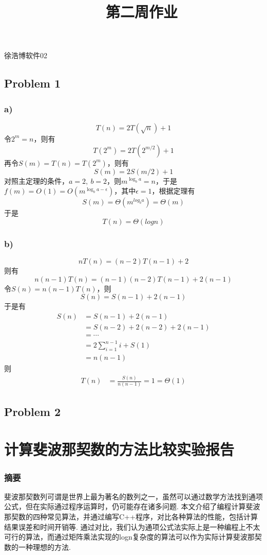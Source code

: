 \documentclass[UTF8]{ctexart}
\begin{document}
\renewcommand{\thefootnote}{\fnsymbol{footnote}}
\linespread{1.4}
\title{\vspace{-5em}\ \ 第二周作业\vspace{-2.5em}}
\date{}
\maketitle
\begin{center}
{\fangsong 徐浩博\quad 软件02}
\end{center}


\subsection*{Problem 1}
\subsubsection*{a)}
$$T(n)=2T(\sqrt{n})+1$$令$2^m=n$，则有$$T(2^m)=2T(2^{m/2})+1$$
再令$S(m)=T(n)=T(2^m)$，则有$$S(m)=2S(m/2)+1$$
对照主定理的条件，$a=2,\ b=2$，则$m^{\log_b a}=n$，于是$f(m)=O(1)=O(m^{\log_b a-\epsilon})$，其中$\epsilon = 1$，根据定理有
$$S(m)=\Theta(m^{log_b a})=\Theta(m)$$
于是
$$T(n)=\Theta(log n)$$
\subsubsection*{b)}
$$nT(n)=(n-2)T(n-1)+2$$
则有$$n(n-1)T(n)=(n-1)(n-2)T(n-1)+2(n-1)$$
令$S(n)=n(n-1)T(n)$，则$$S(n)=S(n-1)+2(n-1)$$
于是有
\begin{align*}
    S(n)&=S(n-1)+2(n-1)\\ &=S(n-2)+2(n-2)+2(n-1)\\ & =\cdots\\
    & = 2\sum\limits^{n-1}_{i=1}i + S(1) \\ & = n(n-1) 
\end{align*}
则
\begin{align*}
    T(n)&=\frac{S(n)}{n(n-1)}=1=\Theta(1)
\end{align*}


\subsection*{Problem 2}
\section*{计算斐波那契数的方法比较实验报告}
\subsubsection*{摘要}
{\kaishu\normalsize  斐波那契数列可谓是世界上最为著名的数列之一，虽然可以通过数学方法找到通项公式，但在实际通过程序运算时，仍可能存在诸多问题. 本文介绍了编程计算斐波那契数的四种常见算法，并通过编写C++程序，对比各种算法的性能，包括计算结果误差和时间开销等. 通过对比，我们认为通项公式法实际上是一种编程上不太可行的算法，而通过矩阵乘法实现的logn复杂度的算法可以作为实际计算斐波那契数的一种理想的方法.}
\end{document}
